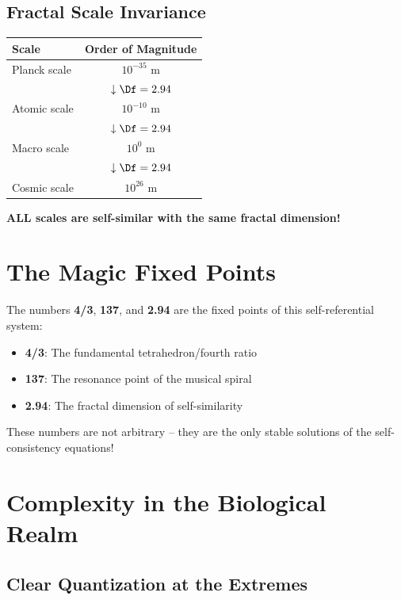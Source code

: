 	\subsection{Fractal Scale Invariance}
	
	\begin{center}
		\begin{tabular}{lc}
			\toprule
			Scale & Order of Magnitude\\
			\midrule
			Planck scale & $10^{-35}$ m\\
			& $\downarrow \Df = 2.94$\\
			Atomic scale & $10^{-10}$ m\\
			& $\downarrow \Df = 2.94$\\
			Macro scale & $10^0$ m\\
			& $\downarrow \Df = 2.94$\\
			Cosmic scale & $10^{26}$ m\\
			\bottomrule
		\end{tabular}
	\end{center}
	
	\textbf{ALL scales are self-similar with the same fractal dimension!}
	
	\section{The Magic Fixed Points}
	
	The numbers \textbf{4/3}, \textbf{137}, and \textbf{2.94} are the fixed points of this self-referential system:
	
	\begin{itemize}
		\item \textbf{4/3}: The fundamental tetrahedron/fourth ratio
		\item \textbf{137}: The resonance point of the musical spiral
		\item \textbf{2.94}: The fractal dimension of self-similarity
	\end{itemize}
	
	These numbers are not arbitrary -- they are the only stable solutions of the self-consistency equations!
	
	\section{Complexity in the Biological Realm}
	
	\subsection{Clear Quantization at the Extremes}
	
